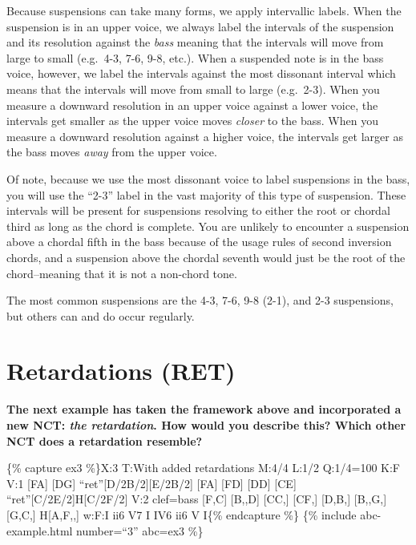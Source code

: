 \documentclass{book}
\begin{document}
Because suspensions can take many forms, we apply intervallic labels. When the
suspension is in an upper voice, we always label the intervals of the
suspension and its resolution against the \emph{bass} meaning that the
intervals will move from large to small (e.g.~4-3, 7-6, 9-8, etc.). When a
suspended note is in the bass voice, however, we label the intervals against
the most dissonant interval which means that the intervals will move from
small to large (e.g.~2-3). When you measure a downward resolution in an upper
voice against a lower voice, the intervals get smaller as the upper voice
moves \emph{closer} to the bass. When you measure a downward resolution
against a higher voice, the intervals get larger as the bass moves \emph{away}
from the upper voice.

Of note, because we use the most dissonant voice to label suspensions in the
bass, you will use the ``2-3'' label in the vast majority of this type of
suspension. These intervals will be present for suspensions resolving to
either the root or chordal third as long as the chord is complete. You are
unlikely to encounter a suspension above a chordal fifth in the bass because
of the usage rules of second inversion chords, and a suspension above the
chordal seventh would just be the root of the chord--meaning that it is not a
non-chord tone.

The most common suspensions are the 4-3, 7-6, 9-8 (2-1), and 2-3 suspensions,
but others can and do occur regularly.

\hypertarget{retardations-ret}{%
\section{Retardations (RET)}\label{retardations-ret}}

\textbf{The next example has taken the framework above and incorporated a new
NCT: \emph{the retardation}. How would you describe this? Which other NCT does
a retardation resemble?}

\{\% capture ex3 \%\}X:3 T:With added retardations M:4/4 L:1/2 Q:1/4=100 K:F
V:1 {[}FA{]}\textbar{} {[}DG{]} ``ret''{[}D/2B/2{]}{[}E/2B/2{]}\textbar{}
{[}FA{]} {[}FD{]}\textbar{} {[}DD{]} {[}CE{]}\textbar{}
``ret''{[}C/2E/2{]}H{[}C/2F/2{]}\textbar{]} V:2 clef=bass {[}F,C{]}\textbar{}
{[}B,,D{]} {[}CC,{]}\textbar{} {[}CF,{]} {[}D,B,{]}\textbar{} {[}B,,G,{]}
{[}G,C,{]}\textbar{} H{[}A,F,,{]}\textbar{]} w:F:I ii6 V7 I IV6 ii6 V I\{\%
endcapture \%\} \{\% include abc-example.html number=``3'' abc=ex3 \%\}
\end{document}
